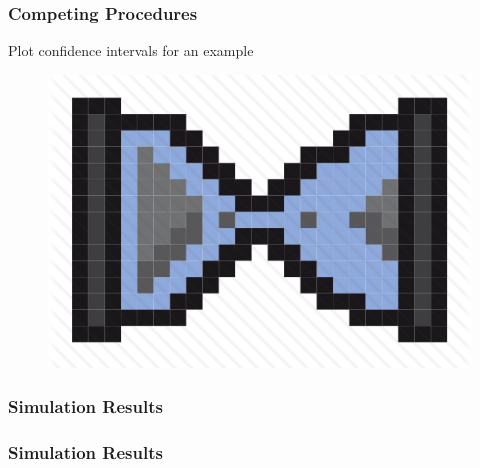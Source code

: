 \documentclass{beamer}
\begin{document}
\begin{frame}
\frametitle{Competing Procedures}

Plot confidence intervals for an example
\begin{figure}
    \includegraphics[scale =  0.5 ]{Figs/hourglass_icon_2.png}
\end{figure}


\end{frame}



\begin{frame}
\frametitle{Simulation Results}




\end{frame}



\begin{frame}
\frametitle{Simulation Results}




\end{frame}
\end{document}
